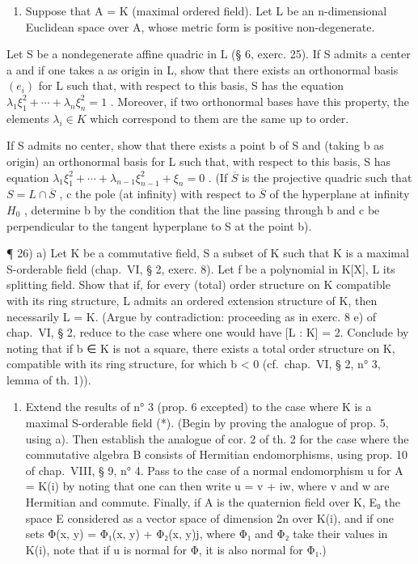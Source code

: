 \begin{enumerate}
\def\labelenumi{\arabic{enumi})}
\setcounter{enumi}{24}
\tightlist
\item
  Suppose that A = K (maximal ordered field). Let L be an n-dimensional Euclidean space over A, whose metric form is positive non-degenerate.
\end{enumerate}

Let S be a nondegenerate affine quadric in L (§ 6, exerc. 25). If S admits a center a and if one takes a as origin in L, show that there exists an orthonormal basis \((e_{i})\) for L such that, with respect to this basis, S has the equation \(\lambda_{1}\xi_{1}^{2} + \cdots + \lambda_{n}\xi_{n}^{2} = 1\) . Moreover, if two orthonormal bases have this property, the elements \(\lambda_{i} \in K\) which correspond to them are the same up to order.

If S admits no center, show that there exists a point b of S and (taking b as origin) an orthonormal basis for L such that, with respect to this basis, S has equation \(\lambda_{1}\xi_{1}^{2} + \cdots + \lambda_{n-1}\xi_{n-1}^{2} + \xi_{n} = 0\) . (If \(\overline{S}\) is the projective quadric such that \(S = L \cap \overline{S}\) , c the pole (at infinity) with respect to \(\overline{S}\) of the hyperplane at infinity \(H_{0}\) , determine b by the condition that the line passing through b and c be perpendicular to the tangent hyperplane to S at the point b).

¶ 26) a) Let K be a commutative field, S a subset of K such that K is a maximal S-orderable field (chap.~VI, § 2, exerc. 8). Let f be a polynomial in K{[}X{]}, L its splitting field. Show that if, for every (total) order structure on K compatible with its ring structure, L admits an ordered extension structure of K, then necessarily L = K. (Argue by contradiction: proceeding as in exerc. 8 e) of chap.~VI, § 2, reduce to the case where one would have {[}L : K{]} = 2. Conclude by noting that if b ∈ K is not a square, there exists a total order structure on K, compatible with its ring structure, for which b \textless{} 0 (cf.~chap.~VI, § 2, n° 3, lemma of th. 1)).

\begin{enumerate}
\def\labelenumi{\alph{enumi})}
\setcounter{enumi}{1}
\tightlist
\item
  Extend the results of n° 3 (prop. 6 excepted) to the case where K is a maximal S-orderable field (*). (Begin by proving the analogue of prop. 5, using a). Then establish the analogue of cor. 2 of th. 2 for the case where the commutative algebra B consists of Hermitian endomorphisms, using prop. 10 of chap.~VIII, § 9, n° 4. Pass to the case of a normal endomorphism u for A = K(i) by noting that one can then write u = v + iw, where v and w are Hermitian and commute. Finally, if A is the quaternion field over K, E₀ the space E considered as a vector space of dimension 2n over K(i), and if one sets Φ(x, y) = Φ₁(x, y) + Φ₂(x, y)j, where Φ₁ and Φ₂ take their values in K(i), note that if u is normal for Φ, it is also normal for Φ₁.)
\end{enumerate}

